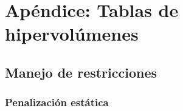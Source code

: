 \chapter{Apéndice: Tablas de hipervolúmenes}
\label{ch:tablas-hipervolumen}

\section{Manejo de restricciones}
\label{ch:manejo-restricciones-experimentacion-anexo-hipervolumen}

\subsection{Penalización estática}
\label{ch:ag-penalizacion-estatica-anexo-hipervolumen}

